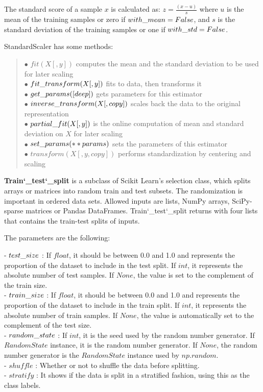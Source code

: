 The standard score of a sample $x$ is calculated as: $z = \frac{(x - u)}{s}$ where $u$ is the mean of the training samples or zero if $with\char`_mean=False$, and $s$ is the standard deviation of the training samples or one if $with\char`_std=False$. \medskip

\noindent StandardScaler has some methods:
\begin{verse}
	$\bullet$ $fit(X[, y])$ computes the mean and the standard deviation to be used for later scaling\\
	$\bullet$ $fit\char`_transform(X[, y])$ fits to data, then transforms it\\
	$\bullet$ $get\char`_params([deep])$ gets parameters for this estimator\\
	$\bullet$ $inverse\char`_transform(X[, copy])$ scales back the data to the original representation\\
	$\bullet$ $partial\char`_fit(X[, y])$ is the online computation of mean and standard deviation on $X$ for later scaling\\
	$\bullet$ $set\char`_params(**params)$ sets the parameters of this estimator\\
	$\bullet$ $transform(X[, y, copy])$ performs standardization by centering and scaling
\end{verse}\smallskip

\textbf{Train\char`_test\char`_split} is a subclass of Scikit Learn's selection class, which splits arrays or matrices into random train and test subsets. The randomization is important in ordered data sets. Allowed inputs are lists, NumPy arrays, SciPy-sparse matrices or Pandas DataFrames. Train\char`_test\char`_split returns with four lists that contains the train-test splits of inputs.\medskip

\noindent The parameters are the following:\smallskip

\noindent - $test\char`_size$ : If $float$, it should be between 0.0 and 1.0 and represents the proportion of the dataset to include in the test split. If $int$, it represents the absolute number of test samples. If $None$, the value is set to the complement of the train size. \\
- $train\char`_size$ : If $float$, it should be between 0.0 and 1.0 and represents the proportion of the dataset to include in the train split. If $int$, it represents the absolute number of train samples. If $None$, the value is automatically set to the complement of the test size.\\
- $random\char`_state$ : If $int$, it is the seed used by the random number generator. If $RandomState$ instance, it is the random number generator. If $None$, the random number generator is the $RandomState$ instance used by $np.random$.\\
- $shuffle$ : Whether or not to shuffle the data before splitting.\\
- $stratify$ : It shows if the data is split in a stratified fashion, using this as the class labels.\bigskip


